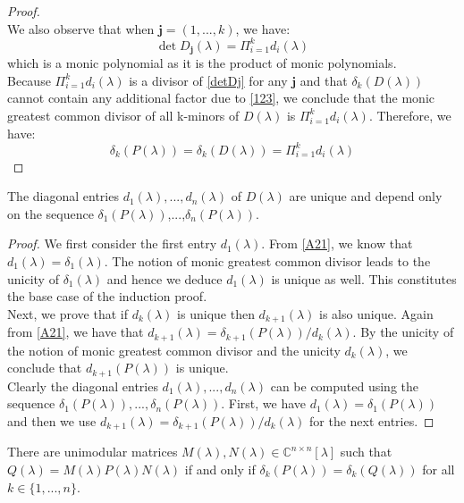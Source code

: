 \documentclass[11pt]{article}
\DeclareMathOperator{\det}{det}
\newcommand{\complex}{\mathbb{C}} %
\begin{document}
\begin{proof}
\begin{equation}
\end{equation}
We also observe that when $\textbf{j}=(1,...,k)$, we have:
\begin{equation}\label{123}
    \det D_{\textbf{j}}(\lambda)=\Pi_{i=1}^k d_i(\lambda)
\end{equation}
which is a monic polynomial as it is the product of monic polynomials.\\
Because $\Pi_{i=1}^k d_i(\lambda)$ is a divisor of \eqref{detDj} for any $\textbf{j}$ and that $\delta_k(D(\lambda))$ cannot contain any additional factor due to \eqref{123}, we conclude that the monic greatest common divisor of all k-minors of $D(\lambda)$ is $\Pi_{i=1}^k d_i(\lambda)$. Therefore, we have:
\begin{equation}\label{A21}
    \delta_k(P(\lambda))=\delta_k(D(\lambda))=\Pi_{i=1}^k d_i(\lambda)
\end{equation}
\end{proof}
The diagonal entries $d_1(\lambda),...,d_n(\lambda)$ of $D(\lambda)$ are unique and depend only on the sequence $\delta_1(P(\lambda))$,...,$\delta_n(P(\lambda))$.
\begin{proof}
We first consider the first entry $d_1(\lambda)$. From \eqref{A21}, we know that $d_1(\lambda)=\delta_1(\lambda)$. The notion of monic greatest common divisor leads to the unicity of $\delta_1(\lambda)$ and hence we deduce $d_1(\lambda)$ is unique as well. This constitutes the base case of the induction proof.\\
Next, we prove that if $d_k(\lambda)$ is unique then $d_{k+1}(\lambda)$ is also unique. Again from \eqref{A21}, we have that $d_{k+1}(\lambda)=\delta_{k+1}(P(\lambda))/d_k(\lambda)$. By the unicity of the notion of monic greatest common divisor and the unicity $d_k(\lambda)$, we conclude that $d_{k+1}(P(\lambda))$ is unique.\\
Clearly the diagonal entries $d_1(\lambda),...,d_n(\lambda)$ can be computed using the sequence $\delta_1(P(\lambda)),...,\delta_n(P(\lambda))$. First, we have $d_1(\lambda)=\delta_1(P(\lambda))$ and then we use $d_{k+1}(\lambda)=\delta_{k+1}(P(\lambda))/ d_k(\lambda)$ for the next entries.
\end{proof}
There are unimodular matrices $M(\lambda),N(\lambda)\in\complex^{n\times n}[\lambda]$ such that $Q(\lambda)=M(\lambda)P(\lambda)N(\lambda)$ if and only if $\delta_k(P(\lambda))=\delta_k(Q(\lambda))$ for all $k\in\{1,...,n\}$.
\end{document}
